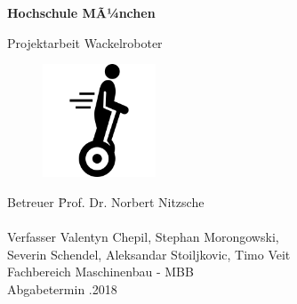 
\begin{titlepage}
\thispagestyle{empty}
\begin{flushleft}
\begin{Huge}
\textbf{Hochschule MÃ¼nchen}
\par\medskip
Projektarbeit Wackelroboter
\end{Huge}
\begin{large}
\par\vspace{5cm}
\begin{figure}[h]
\centering\includegraphics[width=0.3\textwidth]{images/segwayIcon.png}

\end{figure}

\par\vspace{5cm}

\begin{large}
\begin{tabbing}
Betreuer \hspace{2cm}\= Prof. Dr. Norbert Nitzsche \\\\
Verfasser \> Valentyn Chepil, Stephan Morongowski, \\ \> Severin Schendel, Aleksandar Stoiljkovic, Timo Veit \\
Fachbereich \> Maschinenbau - MBB \\
Abgabetermin .2018

\end{tabbing}
\end{large}




\end{large}
\end{flushleft}


\vfill %
\end{titlepage}
\restoregeometry
